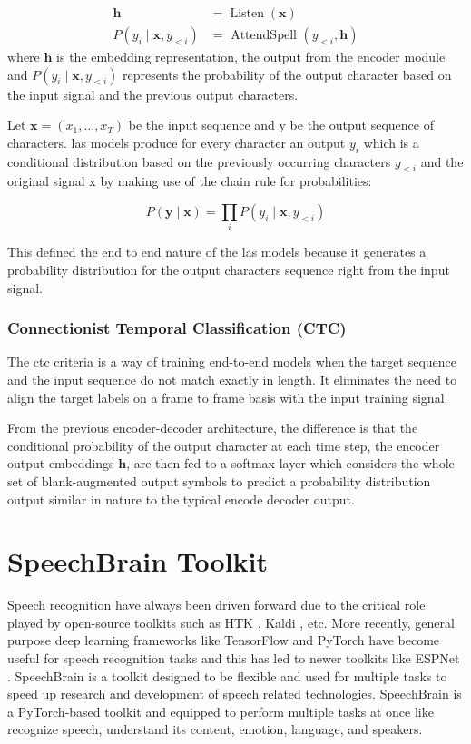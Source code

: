 $$
\begin{aligned}
\mathbf{h} &=\operatorname{Listen}(\mathbf{x}) \\
P\left(y_{i} \mid \mathbf{x}, y_{<i}\right) &=\text { AttendSpell }\left(y_{<i}, \mathbf{h}\right)
\end{aligned}
$$
where $ \mathbf{h}$ is the embedding representation, the output from the encoder module and $P\left(y_{i} \mid \mathbf{x}, y_{<i}\right)$ represents the probability of the output character based on the input signal and the previous output characters.

Let $\mathbf{x}=\left(x_{1}, \ldots, x_{T}\right)$ be the input sequence and $\mathrm{y}$ be the output sequence of characters. \acrshort{las} models produce for every character an output $y_{i}$ which is a conditional distribution based on the previously occurring characters $y_{<i}$ and the original signal $\mathrm{x}$ by making use of the chain rule for probabilities:

$$
P(\mathbf{y} \mid \mathbf{x})=\prod_{i} P\left(y_{i} \mid \mathbf{x}, y_{<i}\right)
$$

This defined the end to end nature of the \acrshort{las} models because it generates a probability distribution for the output characters sequence right from the input signal. 

\subsubsection{Connectionist Temporal Classification (CTC)}
\label{section:ctc}
The \acrshort{ctc} criteria is a way of training end-to-end models when the target sequence and the input sequence do not match exactly in length. It eliminates the need to align the target labels on a frame to frame basis with the input training signal. 

From the previous encoder-decoder architecture, the difference is that the conditional probability of the output character at each time step, the encoder output embeddings $\mathbf{h}$, are then fed to a softmax layer which considers the whole set of blank-augmented output symbols to predict a probability distribution output similar in nature to the typical encode decoder output.


\section{SpeechBrain Toolkit}
\label{section:sb}
Speech recognition have always been driven forward due to the critical role played by open-source toolkits such as HTK \cite{Young2002TheBook}, Kaldi \cite{Povey2011TheToolkit}, etc. More recently, general purpose deep learning frameworks like TensorFlow \cite{Abadi2016TensorFlow:Systems} and PyTorch \cite{Paszke2019PyTorch:Library} have become useful for speech recognition tasks and this has led to newer toolkits like ESPNet \cite{Watanabe2018ESPnet:Toolkit}. SpeechBrain \cite{Ravanelli2021SpeechBrain:Toolkit} is a toolkit designed to be flexible and used for multiple tasks to speed up research and development of speech related technologies.  SpeechBrain is a PyTorch-based toolkit and equipped to perform multiple tasks at once like recognize speech, understand its content, emotion, language, and speakers. 

